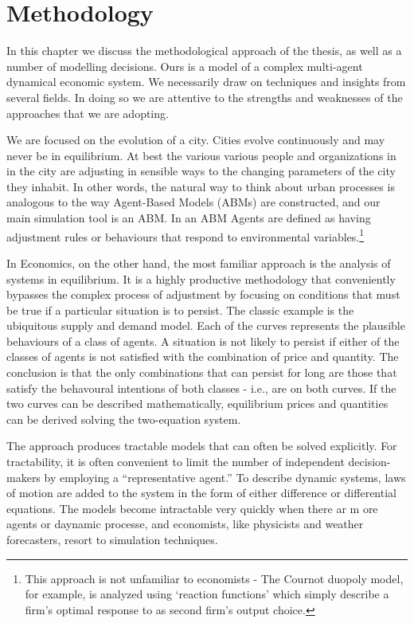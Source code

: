 \chapter{Methodology} \label{chapter-methodology}

In this chapter we discuss the methodological approach of the thesis, as well as a number of modelling decisions. Ours is a  model of a complex multi-agent dynamical economic system. We necessarily draw on techniques and insights from several fields. In doing so we are attentive to the strengths and weaknesses of the approaches that we are adopting. 

We are focused on the evolution of a city. Cities evolve continuously and may never be in  equilibrium. At best the various various people and organizations in  in the city are adjusting in sensible ways to the changing parameters of the city they inhabit. In other words, the natural way to think about urban processes is analogous to the way Agent-Based Models (ABMs)  are constructed, and our main simulation tool is an ABM. In an ABM Agents are defined as having adjustment rules or behaviours that respond to environmental variables.\footnote{This approach is not unfamiliar to economists - The Cournot duopoly model, for example,  is analyzed using  `reaction functions' which simply describe a firm's optimal response to as second firm's output choice. }

In Economics, on the other hand, the most familiar approach is the  analysis of systems in equilibrium. It is a highly productive methodology that conveniently  bypasses the complex process of adjustment by focusing on conditions that must be true if a particular situation is to persist. The classic example is the ubiquitous supply and demand model. Each of the curves represents the plausible behaviours of a class of agents. A  situation is not likely to persist if either of the classes of agents is not satisfied with the combination of price and quantity. The conclusion   is that the only combinations that can persist for long are  those that satisfy the behavoural intentions of both classes - i.e., are on both curves. If the two curves can be described mathematically, equilibrium prices and quantities can be derived solving the two-equation system.

The approach produces tractable  models that can often be solved explicitly. For tractability, it is often convenient to limit the number of independent decision-makers by employing a ``representative agent.'' To describe dynamic systems, laws of motion are added to the system in the form of either difference or differential equations. The models become intractable very quickly when there ar m ore agents or daynamic processe, and economists, like physicists and weather forecasters, resort to simulation techniques. 

